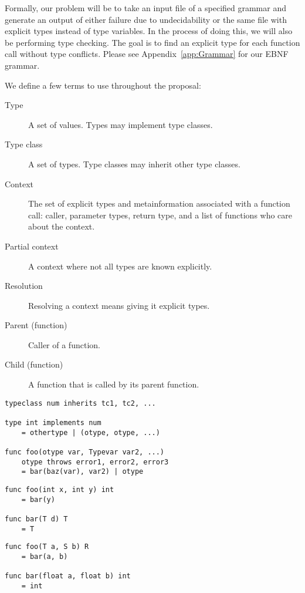 \documentclass{acm_proc_article-sp}
\begin{document}
Formally, our problem will be to take an input file of a specified grammar and
generate an output of either failure due to undecidability or the same file
with explicit types instead of type variables. In the process of doing this, we
will also be performing type checking. The goal is to find an explicit type for
each function call without type conflicts. Please see Appendix~\ref{app:Grammar}
for our EBNF grammar.

We define a few terms to use throughout the proposal:
\begin{description}
	\item[Type] A set of values. Types may implement type classes.
	\item[Type class] A set of types. Type classes may inherit other type classes.
	\item[Context] The set of explicit types and metainformation associated
		with a function call: caller, parameter types, return type,
		and a list of functions who care about the context.
	\item[Partial context] A context where not all types are known explicitly.
	\item[Resolution] Resolving a context means giving it explicit types.
	\item[Parent (function)] Caller of a function.
	\item[Child (function)] A function that is called by its parent function.
\end{description}

\begin{lstlisting}[caption=Grammar displayed informally,language=Paratype]
typeclass num inherits tc1, tc2, ...

type int implements num
    = othertype | (otype, otype, ...)

func foo(otype var, Typevar var2, ...)
    otype throws error1, error2, error3
    = bar(baz(var), var2) | otype
\end{lstlisting}

\begin{lstlisting}[caption=Explicit context provided by parents,language=Paratype]
func foo(int x, int y) int
    = bar(y)

func bar(T d) T
    = T
\end{lstlisting}

\begin{lstlisting}[caption=Explicit context provided by child,language=Paratype]
func foo(T a, S b) R
    = bar(a, b)

func bar(float a, float b) int
    = int
\end{lstlisting}
\end{document}
